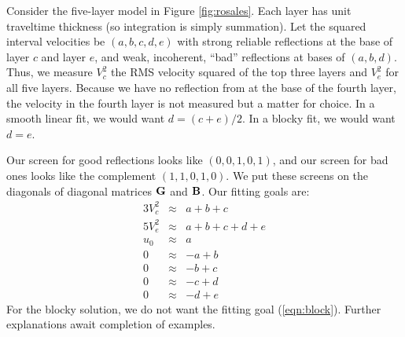 \par
Consider the five-layer model in Figure \ref{fig:rosales}.
Each layer has unit traveltime thickness
(so integration is simply summation).
Let the squared interval velocities be $(a,b,c,d,e)$
with strong reliable reflections at the base of layer $c$ and layer $e$,
and weak, incoherent, ``bad'' reflections at bases of $(a,b,d)$.
Thus, we measure $V_c^2$ the RMS velocity squared of the top three layers
and $V_e^2$ for all five layers.
Because we have no reflection from at the base of the fourth layer,
the velocity in the fourth layer is not measured but a matter for choice.
In a smooth linear fit, we would want $d=(c+e)/2$.
In a blocky fit, we would want $d=e$.



\par
Our screen for good reflections looks like $(0,0,1,0,1)$,
and our screen for bad ones looks like the complement $(1,1,0,1,0)$.
We put these screens on the diagonals of diagonal matrices
$\bold G$ and $\bold B$.
Our fitting goals are:
\begin{eqnarray}
3V_c^2 &\approx& a+b+c
\\
5V_e^2 &\approx& a+b+c+d+e
\\
u_0 &\approx& a
\\
0 &\approx& -a+b
\\
0 &\approx& -b+c
\\
0 &\approx& -c+d
\label{eqn:block}
\\
0 &\approx& -d+e
\end{eqnarray}
For the blocky solution, we do not want the fitting goal (\ref{eqn:block}).
Further explanations await completion of examples.

